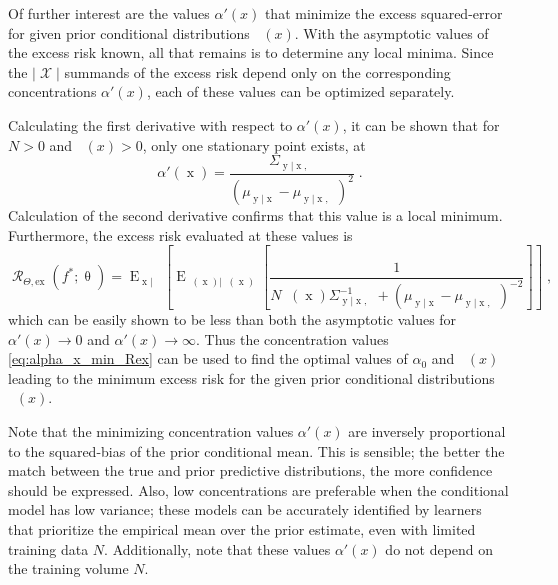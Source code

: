 \documentclass[12pt]{report}
\newcommand{\todomid}[1]{\todo[inline,color=yellow!50,linecolor=red]{#1}}
\DeclareMathOperator{\xrm}{\mathrm{x}}
\DeclareMathOperator{\yrm}{\mathrm{y}}
\DeclareMathOperator{\Erm}{\mathrm{E}}
\DeclareMathOperator{\Xcal}{\mathcal{X}}
\DeclareMathOperator{\Rcal}{\mathcal{R}}
\DeclareMathOperator{\thetam}{\theta_\text{m}}
\DeclareMathOperator{\upthetam}{\uptheta_\text{m}}
\DeclareMathOperator{\upthetac}{\uptheta_\text{c}}
\DeclareMathOperator{\uppsim}{\uppsi_\text{m}}
\DeclareMathOperator{\alpham}{\alpha_\text{m}}
\DeclareMathOperator{\alphac}{\alpha_\text{c}}
\begin{document}
Of further interest are the values $\alpha'(x)$ that minimize the excess squared-error for given prior conditional distributions $\alphac(x)$. With the asymptotic values of the excess risk known, all that remains is to determine any local minima. Since the $|\Xcal|$ summands of the excess risk depend only on the corresponding concentrations $\alpha'(x)$, each of these values can be optimized separately. 

\todomid{add the derivative details below???}

Calculating the first derivative with respect to $\alpha'(x)$, it can be shown that for $N > 0$ and $\thetam(x) > 0$, only one stationary point exists, at 
\begin{equation} \label{eq:alpha_x_min_Rex}
\alpha'(\xrm) = \frac{\Sigma_{\yrm | \xrm,\upthetac}}{\left( \mu_{\yrm | \xrm} - \mu_{\yrm | \xrm,\upthetac} \right)^2} \;.
\end{equation}
Calculation of the second derivative confirms that this value is a local minimum. Furthermore, the excess risk evaluated at these values is 
\begin{equation}
\Rcal_{\Theta, \mathrm{ex}}(f^* ; \uptheta) = \Erm_{\xrm | \upthetam}\left[ \Erm_{\uppsim(\xrm) | \upthetam(\xrm)}\left[ \frac{1}{N \uppsim(\xrm) \Sigma_{\yrm | \xrm,\upthetac}^{-1} + \left( \mu_{\yrm | \xrm} - \mu_{\yrm | \xrm,\upthetac} \right)^{-2}} \right] \right] \;,
\end{equation}
which can be easily shown to be less than both the asymptotic values for $\alpha'(x) \to 0$ and $\alpha'(x) \to \infty$. Thus the concentration values \eqref{eq:alpha_x_min_Rex} can be used to find the optimal values of $\alpha_0$ and $\alpham(x)$ leading to the minimum excess risk for the given prior conditional distributions $\alphac(x)$.

Note that the minimizing concentration values $\alpha'(x)$ are inversely proportional to the squared-bias of the prior conditional mean. This is sensible; the better the match between the true and prior predictive distributions, the more confidence should be expressed. Also, low concentrations are preferable when the conditional model has low variance; these models can be accurately identified by learners that prioritize the empirical mean over the prior estimate, even with limited training data $N$. Additionally, note that these values $\alpha'(x)$ do not depend on the training volume $N$.



\end{document}
